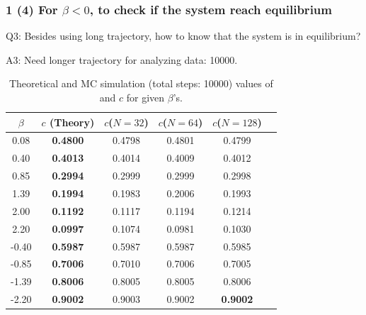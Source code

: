 \documentclass[8pt]{beamer}
\begin{document}
	
\begin{frame}
		\frametitle{1 (4) For $\beta < 0$, to check if the system reach  equilibrium}
		Q3: Besides using long trajectory, how to know that the system is in equilibrium?  
		
		A3: Need longer trajectory for analyzing data: 10000.
		
		\begin{table}[htbp]
			\centering
			\caption{\label{tab:table_lino3} Theoretical and MC simulation (total steps: 10000) values of and $c$ for given $\beta$'s.}
			\begin{tabular}{cccccc}
				$\beta$ & $c$ (Theory) & $c$($N=32$) & $c$($N=64$) & $c$($N=128$) \\
				\hline
				0.08 & \textbf{0.4800}  & 0.4798 &  0.4801 & 0.4799  \\
				0.40 & \textbf{0.4013} & 0.4014 &   0.4009 & 0.4012  \\
				0.85 & \textbf{0.2994} & 0.2999 &  0.2999 & 0.2998 \\
				1.39 & \textbf{0.1994} & 0.1983  &  0.2006 & 0.1993  \\
				2.00 & \textbf{0.1192} & 0.1117  &  0.1194 &  0.1214 \\
				2.20 & \textbf{0.0997} & 0.1074 & 0.0981 & 0.1030 \\
			  -0.40 & \textbf{0.5987} & 0.5987 & 0.5987 & 0.5985 \\
			  -0.85 & \textbf{0.7006} & 0.7010 & 0.7006 & 0.7005 \\
			  -1.39 & \textbf{0.8006} & 0.8005 & 0.8005 & 0.8006 \\
			  -2.20 & \textbf{0.9002} & 0.9003 & 0.9002 & \textbf{0.9002} 
			\end{tabular}
		\end{table}
\end{frame}
	
\end{document}
